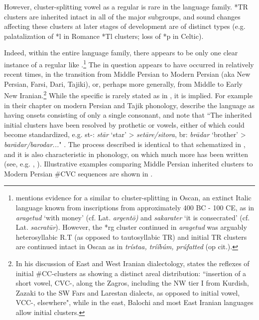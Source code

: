 \documentclass[output=paper,
modfonts
]{LSP/langsci}
\begin{document}
However, cluster-splitting vowel  as a regular  is
rare in the  language family. *TR clusters are inherited
intact in all of the major subgroups, and sound changes affecting these
clusters at later stages of development are of distinct types (e.g.
palatalization of *l in Romance *Tl clusters; loss of *p in Celtic).

Indeed, within the entire  language family, there appears
to be only one clear instance of a regular  like
.\footnote{\citet[302--303]{fortson2011} mentions evidence for a 
  similar to cluster-splitting  in Oscan, an extinct Italic
  language known from inscriptions from approximately 400 BC - 100 CE,
  as in \emph{aragetud} `with money' (cf. Lat. \emph{argentō)} and
  \emph{sakarater} `it is consecrated' (cf. Lat. \emph{sacratūr}).
  However, the *rg cluster continued in \emph{aragetud} was arguably
  heterosyllabic R.T (as opposed to tautosyllabic TR) and initial TR
  clusters are continued intact in Oscan as in \emph{trístaa, trííbúm,
  prúfatted} (op cit.).} The  in question appears to have
occurred in relatively recent times, in the transition from Middle
Persian to Modern Persian (aka New Persian, Farsi, Dari, Tajiki), or,
perhaps more generally, from Middle to Early New Iranian.\footnote{In
  his discussion of East and West Iranian dialectology, \citet[21]{windfuhr2009} states the reflexes of initial \#CC-clusters as showing a
  distinct areal distribution: ``insertion of a short vowel, CVC-, along
  the Zagros, including the NW tier I from Kurdish, Zazaki to the SW
  Fars and Larestan dialects, as opposed to initial vowel, VCC-,
  elsewhere", while in the east, Balochi and most East Iranian languages
  allow initial clusters.} While the specific  is rarely
stated as in , it is implied. For example in their chapter on modern
Persian and Tajik phonology, \citet[427--428]{windfuhrperry2009} describe
the language as having  onsets consisting of only a single
consonant, and note that ``The inherited initial clusters have been
resolved by prothetic or  vowels, either of which could become
standardized, e.g. st-: \emph{stār} `star' \textgreater{}
\emph{setāre/sitora}, br: \emph{brādar} `brother' \textgreater{}
\emph{barādar/barodar...}"  \citep[428]{windfuhrperry2009}. The  process
described is identical to that schematized in , and it is also
characteristic in  phonology, on which much more has been
written (see, e.g. \citealt{strain1968a}, \citealt{karimi1987a}). Illustrative examples
comparing Middle Persian inherited clusters to Modern Persian \#CVC
sequences are shown in .
\end{document}
